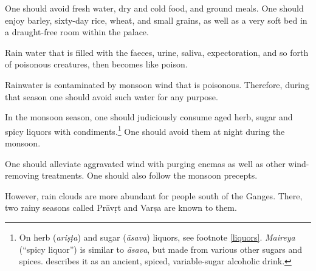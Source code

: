 \begin{translation}
	\item[68]
	One should avoid fresh water, %
	dry and cold food, and ground meals.%
	One should enjoy barley, sixty-day rice, %
	wheat, and small grains, %
	as well as a very soft bed in a draught-free room within the palace.

	\item[69]
	Rain water %
	that is filled with %
	the faeces, urine, saliva, %
	expectoration, %
	and so forth of poisonous creatures, then becomes like poison. %

	\item[70]
	Rainwater is contaminated %
	by monsoon wind %
	that is poisonous. %
	Therefore, %
	during that season one should avoid such water for any purpose.

	\item[71]
	In the monsoon season, %
	one should judiciously %
	consume aged %
	herb, sugar and spicy liquors
	with condiments.\footnote{On herb (\emph{ariṣṭa}) and sugar (\emph{āsava}) liquors, see footnote \ref{liquors}. \emph{Maireya} (``spicy liquor'') is similar to \emph{āsava}, but made from various other sugars and spices. \citet[50--53]{mchu-2021} describes it as an ancient, spiced, variable-sugar alcoholic drink.} %
	One should avoid them at night during the monsoon.

	\item[72]
	One should alleviate aggravated wind with purging %
	enemas as well as other wind-removing treatments. One should also follow the monsoon precepts.

	\item[73]
	However, rain %
	clouds %
	are more abundant %
	for people south of the Ganges.
	There, two rainy seasons called Prāvṛt and Varṣa are known to them. %


\end{translation}
